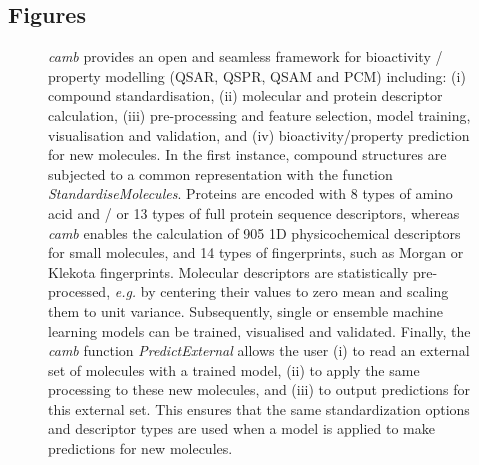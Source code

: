 \documentclass{bmcart}
\begin{document}
\begin{backmatter}


\section*{Figures}
  \begin{figure}[h!]
  \caption{
      {\it camb} provides an open and seamless framework for bioactivity / property modelling (QSAR, QSPR, QSAM and PCM) including: 
(i) compound standardisation, 
(ii) molecular and protein descriptor calculation, 
(iii) pre-processing and feature selection, model training, visualisation and validation, 
and (iv) bioactivity/property prediction for new molecules.
In the first instance, compound structures are subjected to a common representation with the function {\it StandardiseMolecules}.
Proteins are encoded with 8 types of amino acid and / or 13 types of full protein sequence descriptors,
whereas {\it camb} enables the calculation of 905 1D physicochemical descriptors for small molecules, 
and 14 types of fingerprints, such as Morgan or Klekota fingerprints.
Molecular descriptors are statistically pre-processed, {\it e.g.} by centering their values to zero mean and scaling them to unit variance.
Subsequently, single or ensemble machine learning models can be trained, visualised and validated.
Finally, the {\it camb} function {\it PredictExternal} allows the user (i) to read an external set of molecules with a trained model,
(ii) to apply the same processing to these new molecules, and (iii) to output predictions for this external set.
This ensures that the same standardization options and descriptor types are used when a model is applied to make predictions for new molecules.}
      \end{figure}


\end{backmatter}
\end{document}
